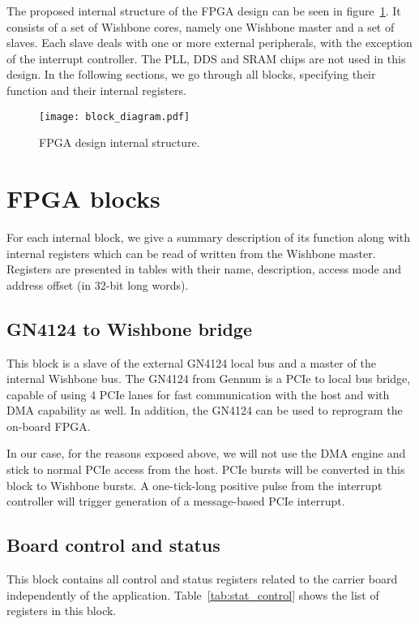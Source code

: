 \documentclass{article}
\begin{document}
The proposed internal structure of the FPGA design can be seen in figure~\ref{fig:block_diagram}. It consists of a set of Wishbone cores, namely one Wishbone master and a set of slaves. Each slave deals with one or more external peripherals, with the exception of the interrupt controller. The PLL, DDS and SRAM chips are not used in this design. In the following sections, we go through all blocks, specifying their function and their internal registers.

\begin{figure}[htbp]
  \centering
  \texttt{[image: block\_diagram.pdf]}
  \caption{FPGA design internal structure.}
  \label{fig:block_diagram}
\end{figure}

\section{FPGA blocks}
For each internal block, we give a summary description of its function along with internal registers which can be read of written from the Wishbone master. Registers are presented in tables with their name, description, access mode and address offset (in 32-bit long words).

\subsection{GN4124 to Wishbone bridge}
This block is a slave of the external GN4124 local bus and a master of the internal Wishbone bus. The GN4124 from Gennum is a PCIe to local bus bridge, capable of using 4 PCIe lanes for fast communication with the host and with DMA capability as well. In addition, the GN4124 can be used to reprogram the on-board FPGA. 

In our case, for the reasons exposed above, we will not use the DMA engine and stick to normal PCIe access from the host. PCIe bursts will be converted in this block to Wishbone bursts. A one-tick-long positive pulse from the interrupt controller will trigger generation of a message-based PCIe interrupt.

\subsection{Board control and status}
This block contains all control and status registers related to the carrier board independently of the application. Table~\ref{tab:stat_control} shows the list of registers in this block.
\end{document}
